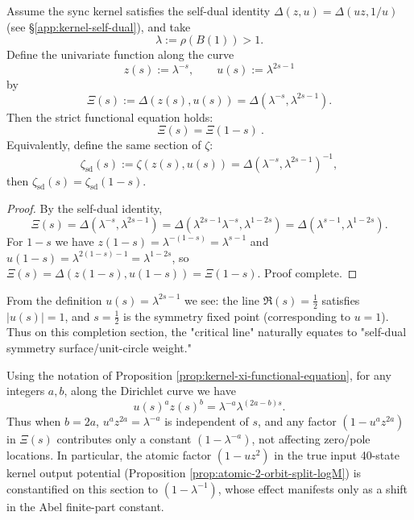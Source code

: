 \begin{proposition}\label{prop:kernel-xi-functional-equation}
Assume the sync kernel satisfies the self-dual identity $\Delta(z,u)=\Delta(uz,1/u)$ (see \S\ref{app:kernel-self-dual}), and take
\[
\lambda:=\rho(B(1))>1.
\]
Define the univariate function along the curve
\[
z(s):=\lambda^{-s},\qquad u(s):=\lambda^{2s-1}
\]
by
\[
\Xi(s):=\Delta(z(s),u(s))=\Delta(\lambda^{-s},\lambda^{2s-1}).
\]
Then the strict functional equation holds:
\[
\boxed{\ \Xi(s)=\Xi(1-s)\ }.
\]
Equivalently, define the same section of $\zeta$:
\[
\zeta_{\mathrm{sd}}(s):=\zeta(z(s),u(s))=\Delta(\lambda^{-s},\lambda^{2s-1})^{-1},
\]
then $\zeta_{\mathrm{sd}}(s)=\zeta_{\mathrm{sd}}(1-s)$.
\end{proposition}
\begin{proof}
By the self-dual identity,
\[
\Xi(s)=\Delta(\lambda^{-s},\lambda^{2s-1})
=\Delta(\lambda^{2s-1}\lambda^{-s},\lambda^{1-2s})
=\Delta(\lambda^{s-1},\lambda^{1-2s}).
\]
For $1-s$ we have
\(
z(1-s)=\lambda^{-(1-s)}=\lambda^{s-1}
\)
and
\(
u(1-s)=\lambda^{2(1-s)-1}=\lambda^{1-2s}
\),
so $\Xi(s)=\Delta(z(1-s),u(1-s))=\Xi(1-s)$. Proof complete.
\end{proof}

\begin{remark}\label{rem:kernel-critical-line-u1}
From the definition $u(s)=\lambda^{2s-1}$ we see: the line $\Re(s)=\tfrac12$ satisfies $|u(s)|=1$, and $s=\tfrac12$ is the symmetry fixed point (corresponding to $u=1$).
Thus on this completion section, the "critical line" naturally equates to "self-dual symmetry surface/unit-circle weight."
\end{remark}

\begin{remark}\label{rem:dirichlet-balanced-atom-constant}
Using the notation of Proposition \ref{prop:kernel-xi-functional-equation}, for any integers \(a,b\), along the Dirichlet curve we have
\[
u(s)^a z(s)^b=\lambda^{-a}\lambda^{(2a-b)s}.
\]
Thus when \(b=2a\), \(u^a z^{2a}=\lambda^{-a}\) is independent of \(s\), and any factor \((1-u^a z^{2a})\) in \(\Xi(s)\) contributes only a constant \((1-\lambda^{-a})\), not affecting zero/pole locations.
In particular, the atomic factor \((1-uz^2)\) in the true input 40-state kernel output potential (Proposition \ref{prop:atomic-2-orbit-split-logM}) is constantified on this section to \((1-\lambda^{-1})\), whose effect manifests only as a shift in the Abel finite-part constant.
\end{remark}

